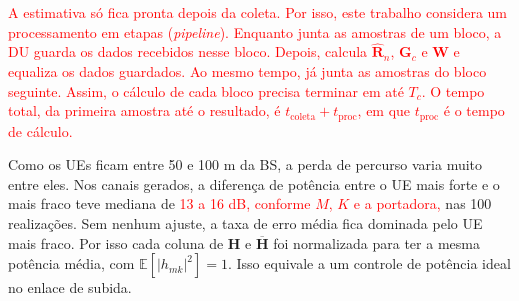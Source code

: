 \textcolor{red}{A estimativa só fica pronta depois da coleta. Por isso, este trabalho considera um processamento em etapas (\textit{pipeline}). Enquanto junta as amostras de um bloco, a DU guarda os dados recebidos nesse bloco. Depois, calcula $\hat{\mathbf{R}}_n$, $\mathbf{G}_c$ e $\mathbf{W}$ e equaliza os dados guardados. Ao mesmo tempo, já junta as amostras do bloco seguinte. Assim, o cálculo de cada bloco precisa terminar em até $T_c$. O tempo total, da primeira amostra até o resultado, é $t_{\text{coleta}} + t_{\text{proc}}$, em que $t_{\text{proc}}$ é o tempo de cálculo.}





Como os UEs ficam entre 50 e 100 m da BS, a perda de percurso varia muito entre eles. Nos canais gerados, a diferença de potência entre o UE mais forte e o mais fraco teve mediana de \textcolor{red}{13 a 16 dB, conforme $M$, $K$ e a portadora,} nas 100 realizações. Sem nenhum ajuste, a taxa de erro média fica dominada pelo UE mais fraco. Por isso cada coluna de $\mathbf{H}$ e $\overline{\mathbf{H}}$ foi normalizada para ter a mesma potência média, com $\mathbb{E}[|h_{mk}|^2] = 1$. Isso equivale a um controle de potência ideal no enlace de subida.

